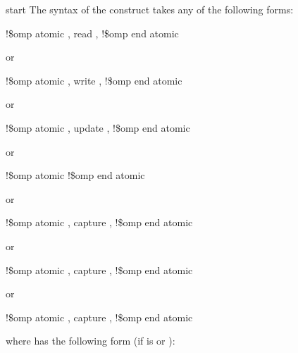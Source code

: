 \fortranspecific start %
The syntax of the  construct takes any of the following forms: 

\begin{boxedcode}
!\$omp atomic \plc{[memory-order-clause[},\plc{]]} read \plc{[[},\plc{]memory-order-clause]}
\plc{[}!\$omp end atomic\plc{]}
\end{boxedcode}

or

\begin{boxedcode}
!\$omp atomic \plc{[memory-order-clause[},\plc{]]} write \plc{[[},\plc{]memory-order-clause]}
\plc{[}!\$omp end atomic\plc{]}
\end{boxedcode}

or

\begin{boxedcode}
!\$omp atomic \plc{[memory-order-clause[},\plc{]]} update \plc{[[},\plc{]memory-order-clause]}
\plc{[}!\$omp end atomic\plc{]}
\end{boxedcode}

or

\begin{boxedcode}
!\$omp atomic 
\plc{[}!\$omp end atomic\plc{]}
\end{boxedcode}

or

\begin{boxedcode}
!\$omp atomic \plc{[memory-order-clause[},\plc{]]} capture \plc{[[},\plc{]memory-order-clause]}
!\$omp end atomic
\end{boxedcode}

or

\begin{boxedcode}
!\$omp atomic \plc{[memory-order-clause[},\plc{]]} capture \plc{[[},\plc{]memory-order-clause]}
!\$omp end atomic
\end{boxedcode}

or

\begin{boxedcode}
!\$omp atomic \plc{[memory-order-clause[},\plc{]]} capture \plc{[[},\plc{]memory-order-clause]}
!\$omp end atomic
\end{boxedcode}

where  has the following form (if  
is  or ):

